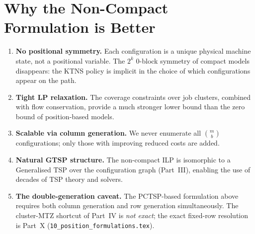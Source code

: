 \documentclass[11pt,a4paper]{article}
\theoremstyle{plain}
\theoremstyle{definition}
\begin{document}
\section{Why the Non-Compact Formulation is Better}
\label{sec:advantages}

\begin{enumerate}
\item \textbf{No positional symmetry.} Each configuration is a unique physical
  machine state, not a positional variable. The $2^k$ 0-block symmetry of compact
  models disappears: the KTNS policy is implicit in the choice of which
  configurations appear on the path.
\item \textbf{Tight LP relaxation.} The coverage constraints over job clusters,
  combined with flow conservation, provide a much stronger lower bound than the
  zero bound of position-based models.
\item \textbf{Scalable via column generation.} We never enumerate all
  $\binom{m}{b}$ configurations; only those with improving reduced costs are added.
\item \textbf{Natural GTSP structure.} The non-compact ILP is isomorphic to a
  Generalised TSP over the configuration graph (Part~III), enabling the use of
  decades of TSP theory and solvers.
\item \textbf{The double-generation caveat.} The PCTSP-based formulation
  above requires both column generation and row generation simultaneously.
  The cluster-MTZ shortcut of Part~IV is \emph{not exact}; the exact fixed-row
  resolution is Part~X (\texttt{10\_position\_formulations.tex}).
\end{enumerate}

%


\end{document}
